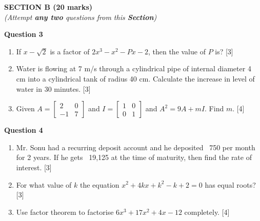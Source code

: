 \newpage
\begin{center}
   \large
   \textbf{SECTION B (20 marks)}\\
   \vspace{5mm}
   \normalsize
   \textit{(Attempt \textbf{any two} questions from this \textbf{Section})}
\end{center}
\par

\noindent
\textbf{Question 3}
\begin{enumerate}[label=(\roman*)]

    \item If $x-\sqrt{2}$ is a factor of $2x^3 -x^2 -Px -2$, then 
        the value of $P$ is? \hfill [3]

    \item Water is flowing at 7 m/s through a cylindrical pipe of 
        internal diameter 4 cm into a cylindrical tank of radius 40 cm.
        Calculate the increase in level of water in 30 minutes. \hfill [3]

    \item Given $A = \begin{bmatrix*} 2 & 0 \\ -1 & 7 \end{bmatrix*}$ 
        and $I = \begin{bmatrix*} 1 & 0 \\ 0 & 1 \end{bmatrix*}$ 
        and $A^2 = 9A + mI$. Find $m$. \hfill [4]

\end{enumerate}

\noindent
\textbf{Question 4}
\begin{enumerate}[label=(\roman*)]

    \item Mr. Sonu had a recurring deposit account and he deposited 
        \rupee~750 per month for 2 years. If he gets \rupee~19,125 at the 
        time of maturity, then find the rate of interest. \hfill [3]

    \item For what value of $k$ the equation $x^2 + 4kx + k^2 -k + 2 = 0$ 
        has equal roots? \hfill [3]

    \item Use factor theorem to factorise $6x^3 + 17x^2 + 4x - 12$ 
        completely. \hfill [4]

\end{enumerate}

